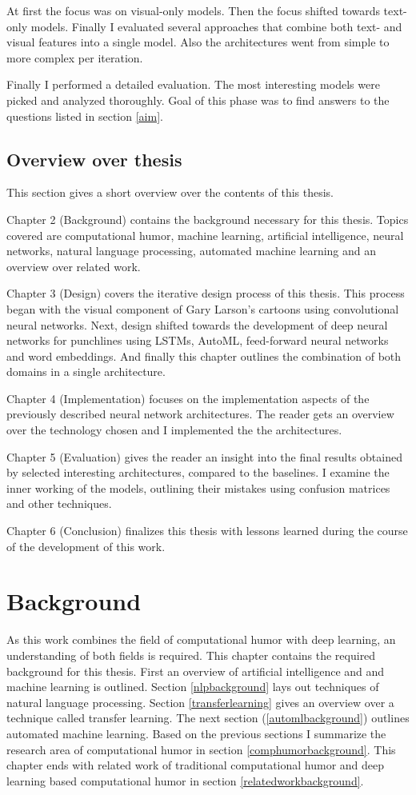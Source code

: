 \documentclass[draft,final,oneside]{vutinfth} %
\begin{document}
At first the focus was on visual-only models. Then the focus shifted towards text-only models. Finally I evaluated several approaches that combine both text- and visual features into a single model. Also the architectures went from simple to more complex per iteration.

Finally I performed a detailed evaluation. The most interesting models were picked and analyzed thoroughly. Goal of this phase was to find answers to the questions listed in section \ref{aim}.
\section{Overview over thesis}
This section gives a short overview over the contents of this thesis.

Chapter 2 (Background) contains the background necessary for this thesis. Topics covered are computational humor, machine learning, artificial intelligence, neural networks, natural language processing, automated machine learning and an overview over related work.

Chapter 3 (Design) covers the iterative design process of this thesis. This process began with the visual component of Gary Larson's cartoons using convolutional neural networks. Next, design shifted towards the development of deep neural networks for punchlines using LSTMs, AutoML, feed-forward neural networks and word embeddings. And finally this chapter outlines the combination of both domains in a single architecture.

Chapter 4 (Implementation) focuses on the implementation aspects of the previously described neural network architectures. The reader gets an overview over the technology chosen and I implemented the the architectures.

Chapter 5 (Evaluation) gives the reader an insight into the final results obtained by selected interesting architectures, compared to the baselines. I examine the inner working of the models, outlining their mistakes using confusion matrices and other techniques.

Chapter 6 (Conclusion) finalizes this thesis with lessons learned during the course of the development of this work. 


\chapter{Background}

As this work combines the field of computational humor with deep learning, an understanding of both fields is required. This chapter contains the required background for this thesis. First an overview of artificial intelligence and and machine learning is outlined. Section \ref{nlpbackground} lays out techniques of natural language processing. Section \ref{transferlearning} gives an overview over a technique called transfer learning. The next section (\ref{automlbackground}) outlines automated machine learning. Based on the previous sections I summarize the research area of computational humor in section \ref{comphumorbackground}. This chapter ends with related work of traditional computational humor and deep learning based computational humor in section \ref{relatedworkbackground}.
\end{document}
